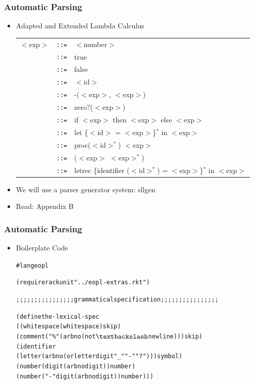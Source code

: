 \documentclass{beamer}
\newcommand{\quot}{\texttt{\textquotesingle{}}}
\newcommand{\is}{\texttt{::=}}
\begin{document}
\begin{frame}[fragile]
\frametitle{Automatic Parsing}
\begin{scriptsize}
\begin{itemize}
\item<1-> Adapted and Extended Lambda Calculus
\begin{tabular}{lll}
  $<$exp$>$ & \is{} & $<$number$>$ \\
            & \is{} & true \\
            & \is{} & false \\
            & \is{} & $<$id$>$ \\
            & \is{} & -($<$exp$>$, $<$exp$>$)\\
            & \is{} & zero?($<$exp$>$)\\
            & \is{} & if $<$exp$>$ then $<$exp$>$ else $<$exp$>$\\
            & \is{} & let \{$<$id$>$ = $<$exp$>$\}$^*$ in $<$exp$>$\\
            & \is{} & proc($<$id$>^*$) $<$exp$>$ \\
            & \is{} & ($<$exp$>$ $<$exp$>^*$) \\
            & \is{} & letrec \{identifier ($<$id$>^*$) = $<$exp$>$\}$^*$ in $<$exp$>$
\end{tabular}

\item<2-> We will use a parser generator system: sllgen

\item<2-> Read: Appendix  B

\end{itemize}
\end{scriptsize}
\end{frame}

\begin{frame}[fragile]
\frametitle{Automatic Parsing}
\begin{scriptsize}
\begin{itemize}
\item<1-> Boilerplate Code
\begin{alltt}
#lang eopl

(require rackunit "../eopl-extras.rkt")

;;;;;;;;;;;;;;;; grammatical specification ;;;;;;;;;;;;;;;;

(define the-lexical-spec
  \quot{}((whitespace (whitespace) skip)
    (comment ("\%" (arbno (not \(\textbackslash\)newline))) skip)
    (identifier
      (letter (arbno (or letter digit "_" "-" "?"))) symbol)
    (number (digit (arbno digit)) number)
    (number ("-" digit (arbno digit)) number)))
\end{alltt}

\end{itemize}
\end{scriptsize}
\end{frame}
\end{document}
